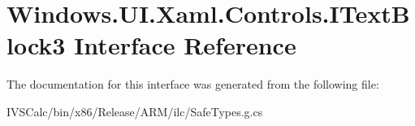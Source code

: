\hypertarget{interface_windows_1_1_u_i_1_1_xaml_1_1_controls_1_1_i_text_block3}{}\section{Windows.\+U\+I.\+Xaml.\+Controls.\+I\+Text\+Block3 Interface Reference}
\label{interface_windows_1_1_u_i_1_1_xaml_1_1_controls_1_1_i_text_block3}


The documentation for this interface was generated from the following file\+:\begin{DoxyCompactItemize}
\item 
I\+V\+S\+Calc/bin/x86/\+Release/\+A\+R\+M/ilc/Safe\+Types.\+g.\+cs\end{DoxyCompactItemize}
